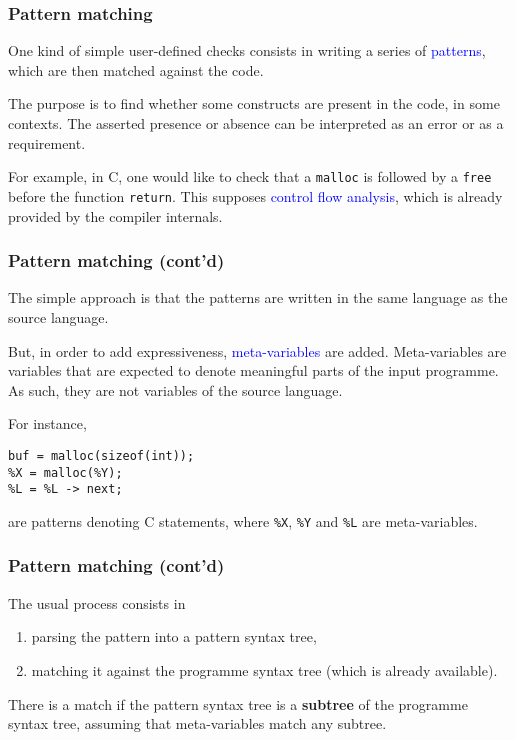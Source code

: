 \documentclass[compress,dvips,xcolor={dvipsnames},t]{beamer}
\newcommand\Clang{\textsf{C}\xspace}
\begin{document}
% 
\begin{frame}
\frametitle{Pattern matching}


One kind of simple user\hyp{}defined checks consists in writing a
series of \textcolor{blue}{patterns}, which are then matched against the code.

The purpose is to find whether some constructs are present in the
code, in some contexts. The asserted presence or absence can be
interpreted as an error or as a requirement.

For example, in \Clang, one would like to check that a \texttt{malloc}
is followed by a \texttt{free} before the function
\texttt{return}. This supposes \textcolor{blue}{control flow analysis}, which
is already provided by the compiler internals.

\end{frame}


% 
\begin{frame}[containsverbatim]
\frametitle{Pattern matching (cont'd)}


The simple approach is that the patterns are written in the same
language as the source language.

But, in order to add expressiveness, \textcolor{blue}{meta\hyp{}variables} are
added. Meta\hyp{}variables are variables that are expected to denote
meaningful parts of the input programme. As such, they are not
variables of the source language.

For instance,
{\small
\begin{verbatim}
buf = malloc(sizeof(int));
%X = malloc(%Y);
%L = %L -> next;
\end{verbatim}
}
are patterns denoting \Clang statements, where \verb|%X|, \verb|%Y|
and \verb|%L| are meta\hyp{}variables.

\end{frame}


% 
\begin{frame}[containsverbatim]
\frametitle{Pattern matching (cont'd)}


The usual process consists in 
\begin{enumerate}

  \item parsing the pattern into a pattern syntax tree,

  \item matching it against the programme syntax tree (which
    is already available).

\end{enumerate}
There is a match if the pattern syntax tree is a \textbf{subtree} of
the programme syntax tree, assuming that meta\hyp{}variables match any
subtree.

\end{frame}
\end{document}
